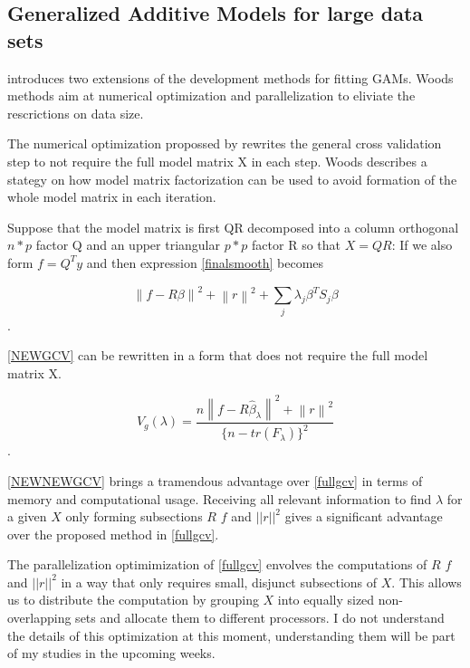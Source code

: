 \documentclass{article}
\begin{document}
    \subsection{Generalized Additive Models for large data sets}
    \cite{bigdataGAM} introduces two extensions of the development methods for fitting GAMs. Woods methods aim at numerical optimization and parallelization to eliviate the rescrictions on data size.

    The numerical optimization propossed by \cite{bigdataGAM} rewrites the general cross validation step to not require the full model matrix X in each step. Woods describes a stategy on how model matrix factorization can be used to avoid formation of the whole model matrix in each iteration.

    Suppose that the model matrix is first QR decomposed into a column orthogonal $n * p$ factor Q and an upper triangular $p * p$ factor R so that $X=QR$: If we also form $f =Q^Ty$ and then expression \ref{finalsmooth} becomes

    \begin{equation} \label{NEWGCV} \left \| f- R\beta \right \|^2 + \left \| r \right \|^2 + \sum_{j}^{ } \lambda_j \beta^T S_j \beta \end{equation}.

    \ref{NEWGCV} can be rewritten in a form that does not require the full model matrix X.

    \begin{equation} \label{NEWNEWGCV} V_g(\lambda) = \frac{n\left \| f-R\widehat{\beta}_\lambda \right \| ^2 + \left  \| r \right \| ^2}{\{n-tr(F_\lambda) \}^2} \end{equation}.

    \ref{NEWNEWGCV} brings a tramendous advantage over \ref{fullgcv} in terms of memory and computational usage. Receiving all relevant information to find $\lambda$ for a given $X$ only forming subsections $R$ $f$ and $||r||^2$ gives a significant advantage over the proposed method in \ref{fullgcv}.

    The parallelization optimimization of \ref{fullgcv} envolves the computations of $R$ $f$ and $||r||^2$ in a way that only requires small, disjunct subsections of $X$. This allows us to distribute the computation by grouping $X$ into equally sized non-overlapping sets and allocate them to different processors. I do not understand the details of this optimization at this moment, understanding them will be part of my studies in the upcoming weeks.
\end{document}
